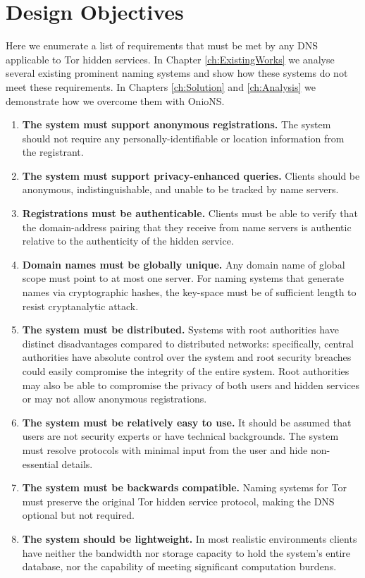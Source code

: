 \section{Design Objectives}
\label{sec:Objectives}

Here we enumerate a list of requirements that must be met by any DNS applicable to Tor hidden services. In Chapter \ref{ch:ExistingWorks} we analyse several existing prominent naming systems and show how these systems do not meet these requirements. In Chapters \ref{ch:Solution} and \ref{ch:Analysis} we demonstrate how we overcome them with OnioNS.

\begin{enumerate}
	\item \textbf{The system must support anonymous registrations.} The system should not require any personally-identifiable or location information from the registrant.
	\item \textbf{The system must support privacy-enhanced queries.} Clients should be anonymous, indistinguishable, and unable to be tracked by name servers.
	\item \textbf{Registrations must be authenticable.} Clients must be able to verify that the domain-address pairing that they receive from name servers is authentic relative to the authenticity of the hidden service. %
	\item \textbf{Domain names must be globally unique.} Any domain name of global scope must point to at most one server. For naming systems that generate names via cryptographic hashes, the key-space must be of sufficient length to resist cryptanalytic attack.
	\item \textbf{The system must be distributed.} Systems with root authorities have distinct disadvantages compared to distributed networks: specifically, central authorities have absolute control over the system and root security breaches could easily compromise the integrity of the entire system. Root authorities may also be able to compromise the privacy of both users and hidden services or may not allow anonymous registrations.
	\item \textbf{The system must be relatively easy to use.} It should be assumed that users are not security experts or have technical backgrounds. The system must resolve protocols with minimal input from the user and hide non-essential details.
	\item \textbf{The system must be backwards compatible.} Naming systems for Tor must preserve the original Tor hidden service protocol, making the DNS optional but not required.
	\item \textbf{The system should be lightweight.} In most realistic environments clients have neither the bandwidth nor storage capacity to hold the system's entire database, nor the capability of meeting significant computation burdens.
\end{enumerate}

